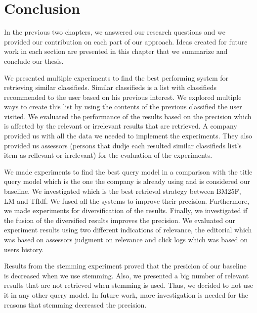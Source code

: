 \chapter{Conclusion}

In the previous two chapters, we answered our research questions and we provided our contribution on each part of our approach. Ideas created for future work in each section are presented in this chapter that we summarize and conclude our thesis.

We presented multiple experiments to find the best performing system for retrieving similar classifieds. Similar classifieds is a list with classifieds recommended to the user based on his previous interest. We explored multiple ways to create this list by using the contents of the previous classified the user visited. We evaluated the performance of the results based on the precision which is affected by the relevant or irrelevant results that are retrieved. A company provided us with all the data we needed to implement the experiments. They also provided us assessors (persons that dudje each resulted similar classifieds list's item as rellevant or irrelevant) for the evaluation of the experiments.


We made experiments to find the best query model in a comparison with the title query model which is the one the company is already using and is considered our baseline. We investigated which is the best retrieval strategy between BM25F, LM and TfIdf. We fused all the systems to improve their precision. Furthermore, we made experiments for diversification of the results. Finally, we investigated if the fusion of the diversified results improves the precision. We evaluated our experiment results using two different indications of relevance, the editorial which was based on assessors judgment on relevance and click logs which was based on users history.


Results from the stemming experiment proved that the presicion of our baseline is decreased when we use stemming. Also, we presented a big number of relevant results that are not retrieved when stemming is used. Thus, we decided to not use it in any other query model. In future work, more investigation is needed for the reasons that stemming decreased the precision.


